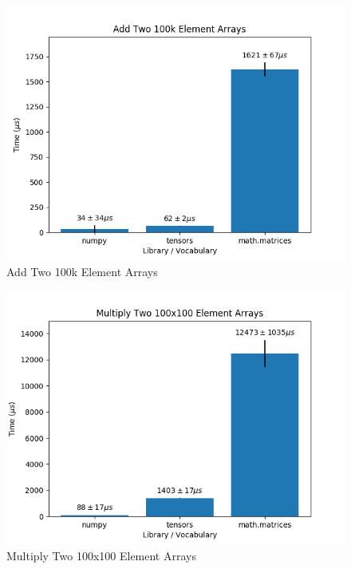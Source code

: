 \documentclass[
]{article}
\begin{document}
\begin{figure}
\centering
\includegraphics{add.png}
\caption{Add Two 100k Element Arrays}
\end{figure}

\begin{figure}
\centering
\includegraphics{matmul.png}
\caption{Multiply Two 100x100 Element Arrays}
\end{figure}
\end{document}
